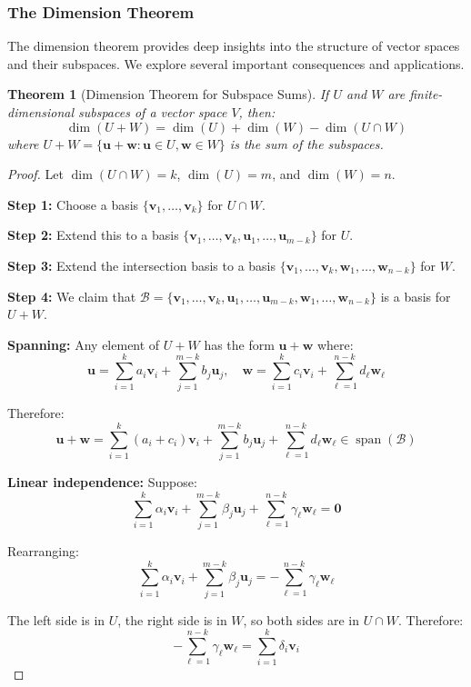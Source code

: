 \documentclass[12pt]{article}
\numberwithin{equation}{section}
\newcommand{\vect}[1]{\boldsymbol{#1}}   %
\newcommand{\Span}{\operatorname{span}}
\theoremstyle{plain}
\newtheorem{theorem}{Theorem}[section]
\theoremstyle{definition}
\theoremstyle{remark}
\begin{document}
\subsubsection{The Dimension Theorem}

The dimension theorem provides deep insights into the structure of vector spaces and their subspaces. We explore several important consequences and applications.

\begin{theorem}[Dimension Theorem for Subspace Sums]
If $U$ and $W$ are finite-dimensional subspaces of a vector space $V$, then:
$$\dim(U + W) = \dim(U) + \dim(W) - \dim(U \cap W)$$
where $U + W = \{\vect{u} + \vect{w} : \vect{u} \in U, \vect{w} \in W\}$ is the sum of the subspaces.
\end{theorem}

\begin{proof}
Let $\dim(U \cap W) = k$, $\dim(U) = m$, and $\dim(W) = n$.

\textbf{Step 1:} Choose a basis $\{\vect{v}_1, \ldots, \vect{v}_k\}$ for $U \cap W$.

\textbf{Step 2:} Extend this to a basis $\{\vect{v}_1, \ldots, \vect{v}_k, \vect{u}_1, \ldots, \vect{u}_{m-k}\}$ for $U$.

\textbf{Step 3:} Extend the intersection basis to a basis $\{\vect{v}_1, \ldots, \vect{v}_k, \vect{w}_1, \ldots, \vect{w}_{n-k}\}$ for $W$.

\textbf{Step 4:} We claim that $\mathcal{B} = \{\vect{v}_1, \ldots, \vect{v}_k, \vect{u}_1, \ldots, \vect{u}_{m-k}, \vect{w}_1, \ldots, \vect{w}_{n-k}\}$ is a basis for $U + W$.

\textbf{Spanning:} Any element of $U + W$ has the form $\vect{u} + \vect{w}$ where:
$$\vect{u} = \sum_{i=1}^k a_i\vect{v}_i + \sum_{j=1}^{m-k} b_j\vect{u}_j, \quad \vect{w} = \sum_{i=1}^k c_i\vect{v}_i + \sum_{\ell=1}^{n-k} d_\ell\vect{w}_\ell$$

Therefore:
$$\vect{u} + \vect{w} = \sum_{i=1}^k (a_i + c_i)\vect{v}_i + \sum_{j=1}^{m-k} b_j\vect{u}_j + \sum_{\ell=1}^{n-k} d_\ell\vect{w}_\ell \in \Span(\mathcal{B})$$

\textbf{Linear independence:} Suppose:
$$\sum_{i=1}^k \alpha_i\vect{v}_i + \sum_{j=1}^{m-k} \beta_j\vect{u}_j + \sum_{\ell=1}^{n-k} \gamma_\ell\vect{w}_\ell = \vect{0}$$

Rearranging:
$$\sum_{i=1}^k \alpha_i\vect{v}_i + \sum_{j=1}^{m-k} \beta_j\vect{u}_j = -\sum_{\ell=1}^{n-k} \gamma_\ell\vect{w}_\ell$$

The left side is in $U$, the right side is in $W$, so both sides are in $U \cap W$. Therefore:
$$-\sum_{\ell=1}^{n-k} \gamma_\ell\vect{w}_\ell = \sum_{i=1}^k \delta_i\vect{v}_i$$


\end{proof}
\end{document}

